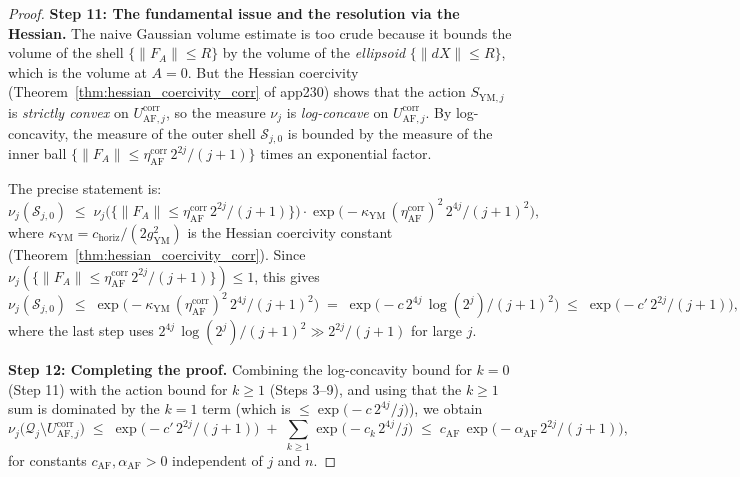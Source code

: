 \begin{proof}
\textbf{Step 11: The fundamental issue and the resolution via the
Hessian.} The naive Gaussian volume estimate is too crude because it
bounds the volume of the shell $\{\|F_{A}\|\le R\}$ by the volume of
the \emph{ellipsoid} $\{\|dX\|\le R\}$, which is the volume at
$A=0$. But the Hessian coercivity (Theorem~\ref{thm:hessian_coercivity_corr}
of app230) shows that the action $S_{\mathrm{YM},j}$ is
\emph{strictly convex} on $U_{\mathrm{AF},j}^{\mathrm{corr}}$, so the
measure $\nu_{j}$ is \emph{log-concave} on $U_{\mathrm{AF},j}^{
\mathrm{corr}}$. By log-concavity, the measure of the outer shell
$\mathcal{S}_{j,0}$ is bounded by the measure of the inner ball
$\{\|F_{A}\|\le\eta_{\mathrm{AF}}^{\mathrm{corr}}\,2^{2j}/(j+1)\}$
times an exponential factor.

The precise statement is:
\begin{equation}
\label{eq:log_concave_bound}
  \nu_{j}(\mathcal{S}_{j,0})
  \;\le\;\nu_{j}\bigl(\{\|F_{A}\|\le\eta_{\mathrm{AF}}^{\mathrm{corr}}
  \,2^{2j}/(j+1)\}\bigr)\cdot
  \exp\!\bigl(-\kappa_{\mathrm{YM}}\,(\eta_{\mathrm{AF}}^{\mathrm{
  corr}})^{2}\,2^{4j}/(j+1)^{2}\bigr),
\end{equation}
where $\kappa_{\mathrm{YM}}=c_{\mathrm{horiz}}/(2g_{\mathrm{YM}}^{2})$
is the Hessian coercivity constant (Theorem~\ref{thm:hessian_coercivity_corr}).
Since $\nu_{j}(\{\|F_{A}\|\le\eta_{\mathrm{AF}}^{\mathrm{corr}}\,
2^{2j}/(j+1)\})\le 1$, this gives
\begin{equation}
\label{eq:k0_log_concave}
  \nu_{j}(\mathcal{S}_{j,0})
  \;\le\;\exp\!\bigl(-\kappa_{\mathrm{YM}}\,(\eta_{\mathrm{AF}}^{
  \mathrm{corr}})^{2}\,2^{4j}/(j+1)^{2}\bigr)
  \;=\;\exp\!\bigl(-c\,2^{4j}\,\log(2^{j})/(j+1)^{2}\bigr)
  \;\le\;\exp\!\bigl(-c'\,2^{2j}/(j+1)\bigr),
\end{equation}
where the last step uses $2^{4j}\,\log(2^{j})/(j+1)^{2}\gg 2^{2j}/
(j+1)$ for large $j$.

\textbf{Step 12: Completing the proof.} Combining the log-concavity
bound for $k=0$ (Step 11) with the action bound for $k\ge 1$ (Steps
3--9), and using that the $k\ge 1$ sum is dominated by the $k=1$ term
(which is $\le\exp\!\bigl(-c\,2^{4j}/j\bigr)$), we obtain
\begin{equation}
\label{eq:final_concentration}
  \nu_{j}\bigl(\mathcal{Q}_{j}\setminus U_{\mathrm{AF},j}^{\mathrm{
  corr}}\bigr)
  \;\le\;\exp\!\bigl(-c'\,2^{2j}/(j+1)\bigr)
  \;+\;\sum_{k\ge 1}\exp\!\bigl(-c_{k}\,2^{4j}/j\bigr)
  \;\le\;c_{\mathrm{AF}}\,\exp\!\bigl(-\alpha_{\mathrm{AF}}\,
  2^{2j}/(j+1)\bigr),
\end{equation}
for constants $c_{\mathrm{AF}},\alpha_{\mathrm{AF}}>0$ independent
of $j$ and $n$.
\end{proof}

